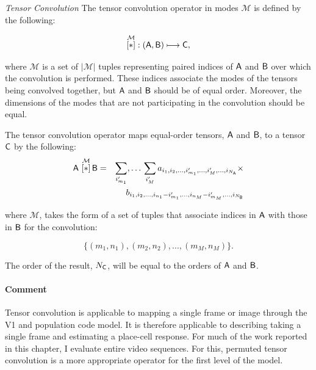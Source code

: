 \begin{definition}{\textit{Tensor Convolution}}\label{def:convop}  The tensor convolution operator in modes $\mathcal{M}$ is defined by the following:

\begin{equation}
 \overset{\mathcal{M}}{[ \ast ]}: \left (\mathsf{A},\mathsf{B}  \right ) \longmapsto \mathsf{C},
\end{equation}

 where $\mathcal{M}$ is a set of $|\mathcal{M}|$ tuples representing paired indices of $\mathsf{A}$ and $\mathsf{B}$ over which the convolution is performed.   These indices associate the modes of the tensors being convolved together, but $\mathsf{A}$ and $\mathsf{B}$ should be of equal order. Moreover, the dimensions of the modes that are not participating in the convolution should be equal.

The tensor convolution operator maps equal-order tensors, $\mathsf{A}$ and $\mathsf{B}$, to a tensor $\mathsf{C}$ by the following:
\begin{eqnarray}
\mathsf{A}\,\, \overset{\mathcal{M}}{[ \ast ]}\, {\mathsf{B}} &=& \sum_{i'_{m_1}},\ldots\,\sum_{i_{M}'}   
a_{i_1,i_2,...,i_{m_1}',...,i_{M}',...,i_{N_{\mathsf{A}}}} \times \nonumber \\
& &b_{i_1,i_2,...,i_{n_1}-i_{m_1}',...,i_{n_M}-i_{m_M}',...,i_{N_{\mathsf{B}}}}
\label{eq:t1}
\end{eqnarray}

where $\mathcal{M}$, takes the form of a set of tuples that associate indices in $\mathsf{A}$ with those in $\mathsf{B}$ for the convolution:

\begin{equation}
\lbrace(m_1,n_1),(m_2,n_2),...,(m_{M},n_{M})\rbrace.
\end{equation}

The order of the result, $N_{\mathsf{C}}$, will be equal to the orders of $\mathsf{A}$ and $\mathsf{B}$.
\end{definition}

\paragraph{Comment}  Tensor convolution is applicable to mapping a single frame or image through the V1 and population code model.  It is therefore applicable to describing taking a single frame and estimating a place-cell response.  For much of the work reported in this chapter, I evaluate entire video sequences. For this, permuted tensor convolution is a more appropriate operator for the first level of the model.

